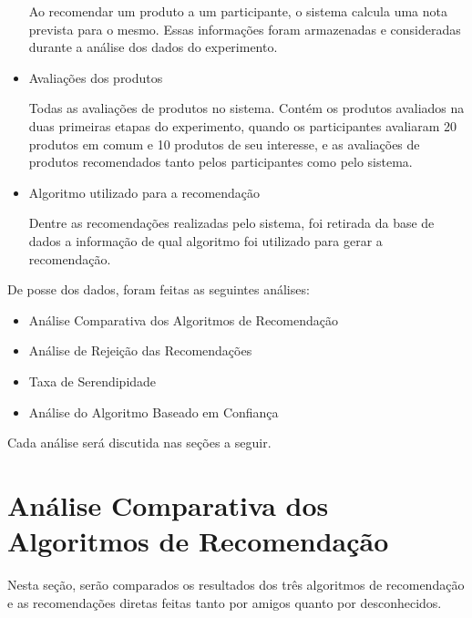 \begin{itemize}
	\subitem Ao recomendar um produto a um participante, o sistema calcula uma nota prevista para o mesmo. Essas informações foram armazenadas e consideradas durante a análise dos dados do experimento.
	
	\item Avaliações dos produtos
	
	\subitem Todas as avaliações de produtos no sistema. Contém os produtos avaliados na duas primeiras etapas do experimento, quando os participantes avaliaram 20 produtos em comum e 10 produtos de seu interesse, e as avaliações de produtos recomendados tanto pelos participantes como pelo sistema.
	
	\item Algoritmo utilizado para a recomendação
	
	\subitem Dentre as recomendações realizadas pelo sistema, foi retirada da base de dados a informação de qual algoritmo foi utilizado para gerar a recomendação.
	
\end{itemize}

 De posse dos dados, foram feitas as seguintes análises:
 
\begin{itemize}
	\item Análise Comparativa dos Algoritmos de Recomendação
	\item Análise de Rejeição das Recomendações
	\item Taxa de Serendipidade
	\item Análise do Algoritmo Baseado em Confiança
\end{itemize}

 Cada análise será discutida nas seções a seguir.
 
\section{Análise Comparativa dos Algoritmos de Recomendação}
\label{sec:analise_comparativa_dos_algoritmos_de_recomendacao}

Nesta seção, serão comparados os resultados dos três algoritmos de recomendação e as recomendações diretas feitas tanto por amigos quanto por desconhecidos.

